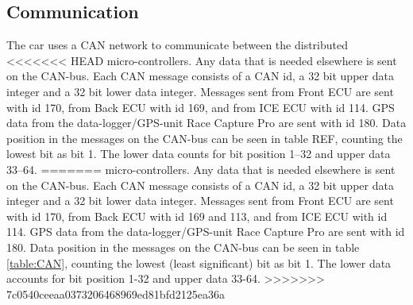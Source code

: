 \subsection{Communication}
The car uses a CAN network to communicate between the distributed
<<<<<<< HEAD
micro-controllers. Any data that is needed elsewhere is sent on the CAN-bus.
Each CAN message consists of a CAN id, a 32 bit upper data integer and a 32 bit
lower data integer. Messages sent from Front ECU are sent with id 170, from
Back ECU with id 169, and from ICE ECU with id 114. GPS data from the
data-logger/GPS-unit Race Capture Pro are sent with id 180. Data position in
the messages on the CAN-bus can be seen in table REF, counting the lowest bit
as bit 1. The lower data counts for bit position 1--32 and upper data 33--64.
=======
micro-controllers. Any data that is needed elsewhere is sent on the CAN-bus. Each CAN message consists of a CAN id, a 32 bit upper data integer and a 32 bit lower data integer. Messages sent from Front ECU are sent with id 170, from Back ECU with id 169 and 113, and from ICE ECU with id 114. GPS data from the data-logger/GPS-unit Race Capture Pro are sent with id 180. Data position in the messages on the CAN-bus can be seen in table \ref{table:CAN}, counting the lowest (least significant) bit as bit 1. The lower data accounts for bit position 1-32 and upper data 33-64.
>>>>>>> 7c0540ceeaa0373206468969ed81bfd2125ea36a

